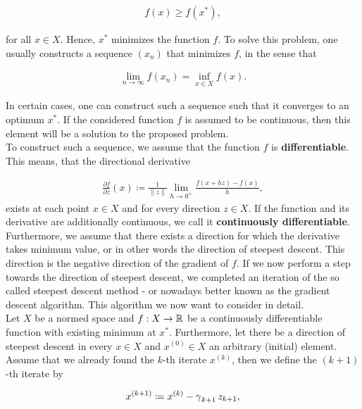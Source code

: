 \begin{align*}
f(x) \geq f(x^{\ast}),
\end{align*}

for all $x\in X$. Hence, $x^{\ast}$ minimizes the function $f$. To solve this problem, one usually constructs a sequence $(x_n)$ that minimizes $f$, in the sense that

\begin{align*}
\lim_{n\to\infty} f(x_n) = \inf_{x\in X} f(x).
\end{align*}

In certain cases, one can construct such a sequence such that it converges to an optimum $x^{\ast}$. If the considered function $f$ is assumed to be continuous, then this element will be a solution to the proposed problem.\\
To construct such a sequence, we assume that the function $f$ is \textbf{differentiable}. This means, that the directional derivative

\begin{align*}
\frac{\partial f}{\partial z} (x) \coloneqq \frac{1}{\|z\|} \lim_{h \to 0^+} \frac{f(x + hz) - f(x)}{h},
\end{align*}
exists at each point $x \in X$ and for every direction $z \in X$. If the function and its derivative are additionally continuous, we call it \textbf{continuously differentiable}.\\
Furthermore, we assume that there exists a direction for which the derivative takes minimum value, or in other words the direction of steepest descent. This direction is the negative direction of the gradient of $f$. If we now perform a step towards the direction of steepest descent, we completed an iteration of the so called steepest descent method - or nowadays better known as the gradient descent algorithm. This algorithm we now want to consider in detail.\\
Let $X$ be a normed space and $f:X\to \operatorname{\mathbb{R}}$ be a continuously differentiable function with existing minimum at $x^{\ast}$.
Furthermore, let there be a direction of steepest descent in every $x \in X$ and $x^{(0)}\in X$ an arbitrary (initial) element. Assume that we already found the $k$-th iterate $x^{(k)}$, then we define the $(k+1)$-th iterate by

\begin{align}\label{eq:gd}
x^{(k+1)} \coloneqq x^{(k)} - \operatorname{\gamma}_{k+1} z_{k+1},
\end{align}

